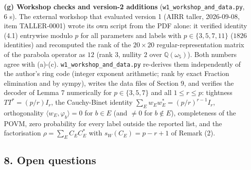 \documentclass[
  11pt,
  a4paper,
]{article}
\begin{document}
\textbf{(g) Workshop checks and version-2 additions}
({\small\texttt{w1\_\allowbreak{}workshop\_\allowbreak{}and\_\allowbreak{}data.\allowbreak{}py}}, 6 s). The external workshop that
evaluated version 1 (AIRR taller, 2026-09-08, item TALLER-0001) wrote
its own script from the PDF alone: it verified identity (4.1) entrywise
modulo \(p\) for all parameters and labels with \(p\in\{3,\allowbreak{}5,\allowbreak{}7,\allowbreak{}11\}\)
(\(1826\) identities) and recomputed the rank of the \(20\times20\)
regular-representation matrix of the parabola operator as \(12\) (rank
\(3\), nullity \(2\) over \(\mathbb Q(\omega_5)\)). Both numbers agree
with (a)-(c). {\small\texttt{w1\_\allowbreak{}workshop\_\allowbreak{}and\_\allowbreak{}data.\allowbreak{}py}} re-derives them
independently of the author's ring code (integer exponent arithmetic;
rank by exact Fraction elimination and by sympy), writes the data files
of Section 9, and verifies the decoder of Lemma 7 numerically for
\(p\in\{3,\allowbreak{}5,\allowbreak{}7\}\) and all \(1\le r\le p\): tightness \(TT^*=(p/r)I_r\),
the Cauchy-Binet identity \(\sum_Ew_Ew_E^*=(p/r)^{r-1}I_r\),
orthogonality \(\langle w_E,\allowbreak{}\varphi_b\rangle=0\) for \(b\in E\) (and
\(\ne0\) for \(b\notin E\)), completeness of the POVM, zero probability
for every label outside the reported list, and the factorisation
\(\rho=\sum_EC_EC_E^*\) with \(s_W(C_E)=p-r+1\) of Remark (2).

\subsection{8. Open questions}\label{open-questions}
\end{document}
